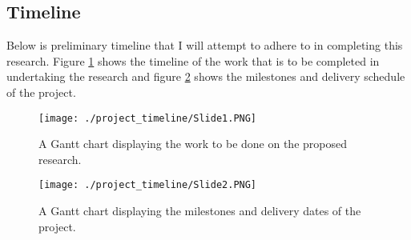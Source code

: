 \documentclass[11pt]{article}
\begin{document}
\subsection{Timeline}
Below is preliminary timeline that I will attempt to adhere to in completing
this research. Figure \ref{fig:main_gantt} shows the timeline of the work that
is to be completed in undertaking the research and figure
\ref{fig:delivery_gantt} shows the milestones and delivery schedule of the
project.
\begin{figure}[!htb]
	\texttt{[image: ./project\_timeline/Slide1.PNG]}
	\caption{A Gantt chart displaying the work to be done on the proposed research.}
	\label{fig:main_gantt}
\end{figure}
\begin{figure}[!htb]
	\texttt{[image: ./project\_timeline/Slide2.PNG]}
	\caption{A Gantt chart displaying the milestones and delivery dates of the project.}
	\label{fig:delivery_gantt}
\end{figure}
\end{document}
